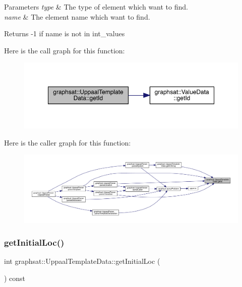 \begin{DoxyParams}{Parameters}
{\em type} & The type of element which want to find. \\
\hline
{\em name} & The element name which want to find.\\
\hline
\end{DoxyParams}
\begin{DoxyReturn}{Returns}
-\/1 if name is not in int\+\_\+values 
\end{DoxyReturn}
Here is the call graph for this function\+:
\nopagebreak
\begin{figure}[H]
\begin{center}
\leavevmode
\includegraphics[width=350pt]{classgraphsat_1_1_uppaal_template_data_ab7517b8ab8d2c8372536603fb2dbf406_cgraph}
\end{center}
\end{figure}
Here is the caller graph for this function\+:
\nopagebreak
\begin{figure}[H]
\begin{center}
\leavevmode
\includegraphics[width=350pt]{classgraphsat_1_1_uppaal_template_data_ab7517b8ab8d2c8372536603fb2dbf406_icgraph}
\end{center}
\end{figure}
\mbox{\label{classgraphsat_1_1_uppaal_template_data_a87b75bb520160d7c5d730d07d2700ec1}} 
\subsubsection{\texorpdfstring{getInitialLoc()}{getInitialLoc()}}
{\footnotesize\ttfamily int graphsat\+::\+Uppaal\+Template\+Data\+::get\+Initial\+Loc (\begin{DoxyParamCaption}{ }\end{DoxyParamCaption}) const\hspace{0.3cm}{\ttfamily [inline]}}


